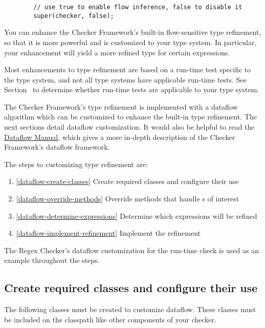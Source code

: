 \begin{Verbatim}
        // use true to enable flow inference, false to disable it
        super(checker, false);
\end{Verbatim}

You can enhance the Checker Framework's built-in flow-sensitive type refinement,
so that it is more powerful and is customized to your type system. In
particular, your enhancement will yield a more refined type for certain
expressions.

Most enhancements to type refinement are based on a
run-time test specific to the type system, and not all type systems have
applicable run-time tests.  See
Section~ to determine whether
run-time tests are applicable to your type system.

The Checker Framework's type refinement is implemented with a dataflow algorithm
which can be customized to enhance the built-in type refinement. The next
sections detail dataflow customization.  It would also be helpful to read the
\href{http://types.cs.washington.edu/checker-framework/current/checker-framework-dataflow-manual.pdf}
{Dataflow Manual}, which gives a more in-depth description of the Checker
Framework's dataflow framework.

The steps to customizing type refinement are:
\begin{enumerate}
\item{\ref{dataflow-create-classes}} Create required classes and configure their
    use
\item{\ref{dataflow-override-methods}} Override methods that handle
    s of interest
\item{\ref{dataflow-determine-expressions}} Determine which expressions will be
    refined
\item{\ref{dataflow-implement-refinement}} Implement the refinement
\end{enumerate}

The Regex Checker's dataflow customization for the
run-time check is used as an example throughout the steps.


\subsection{Create required classes and configure their use\label{dataflow-create-classes}}

The following classes must be created to customize dataflow. These classes must
be included on the classpath like other components of your checker.

